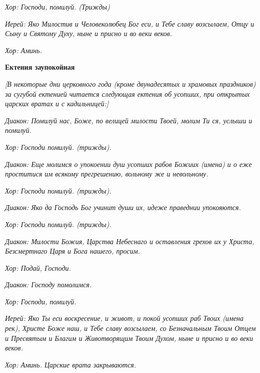 \itshape Хор:\normalfont{} Господи, помилуй. \itshape (Трижды)\normalfont{}


\itshape Иерей:\normalfont{} Яко Милостив и Человеколюбец Бог еси, и Тебе славу возсылаем, Отцу и Сыну и Святому Духу, ныне и присно и во веки веков.


\itshape Хор\normalfont{}: Аминь.





\bfseries Ектения заупокойная\normalfont{}


\itshape [В некоторые дни церковного года (кроме двунадесятых и храмовых праздников) за сугубой ектенией читается следующая ектения об усопших, при открытых царских вратах и с кадильницей:]\normalfont{}


\itshape Диакон:\normalfont{} Помилуй нас, Боже, по велицей милости Твоей, молим Ти ся, услыши и помилуй.


\itshape Хор:\normalfont{} Господи помилуй. \itshape (трижды)\normalfont{}.


\itshape Диакон:\normalfont{} Еще молимся о упокоении душ усопших рабов Божиих \itshape (имена)\normalfont{} и о еже проститися им всякому прегрешению, вольному же и невольному.


\itshape Хор:\normalfont{} Господи помилуй. \itshape (трижды)\normalfont{}.


\itshape Диакон:\normalfont{} Яко да Господь Бог учинит души их, идеже праведнии упокояются.


\itshape Хор:\normalfont{} Господи помилуй. \itshape (трижды)\normalfont{}.


\itshape Диакон:\normalfont{} Милости Божия, Царства Небеснаго и оставления грехов их у Христа, Безсмертнаго Царя и Бога нашего, просим.


\itshape Хор:\normalfont{} Подай, Господи.


\itshape Диакон:\normalfont{} Господу помолимся.


\itshape Хор:\normalfont{} Господи, помилуй.


\itshape Иерей:\normalfont{} Яко Ты еси воскресение, и живот, и покой усопших раб Твоих \itshape (имена рек)\normalfont{}, Христе Боже наш, и Тебе славу возсылаем, со Безначальным Твоим Отцем и Пресвятым и Благим и Животворящим Твоим Духом, ныне и присно и во веки веков.


\itshape Хор\normalfont{}: Аминь. \itshape Царские врата закрываются.\normalfont{}





